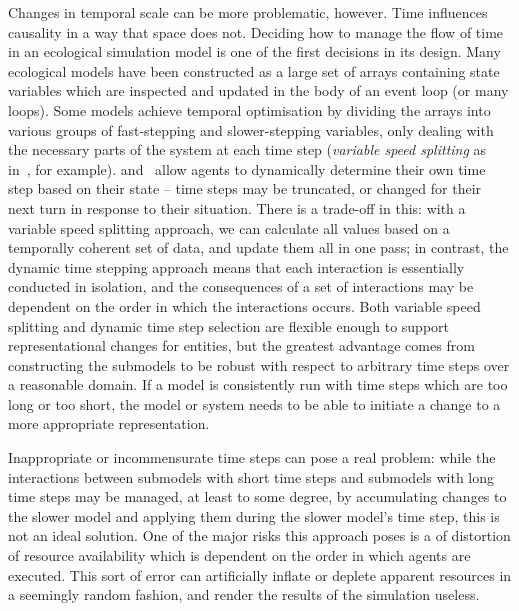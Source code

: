 Changes in temporal scale can be more problematic, however. Time
influences causality in a way that space does not. Deciding how to
manage the flow of time in an ecological simulation model is one of
the first decisions in its design.  Many ecological models have been
constructed as a large set of arrays containing state variables which
are inspected and updated in the body of an event loop (or many
loops). Some models achieve temporal optimisation by dividing the
arrays into various groups of fast-stepping and slower-stepping
variables, only dealing with the necessary parts of the system at each
time step (\emph{variable speed splitting\/} as
in~\cite{walters2000ecosystem}, for example). \Cite{gray2006nws}
and~\cite{gray2014} allow agents to dynamically determine their own
time step based on their state --  time steps may be truncated, or
changed for their next turn in response to their situation. There is a
trade-off in this: with a variable speed splitting approach, we can
calculate all values based on a temporally coherent set of data, and
update them all in one pass; in contrast, the dynamic time stepping
approach means that each interaction is essentially conducted in
isolation, and the consequences of a set of interactions may be
dependent on the order in which the interactions occurs. Both variable
speed splitting and dynamic time step selection are flexible enough to
support representational changes for entities, but the greatest
advantage comes from constructing the submodels to be robust with
respect to arbitrary time steps over a reasonable domain.  If a model
is consistently run with time steps which are too long or too short,
the model or system needs to be able to initiate a change to a more
appropriate representation.

Inappropriate or incommensurate time steps can pose a real problem:
while the interactions between submodels with short time steps and
submodels with long time steps may be managed, at least to some degree,
by accumulating changes to the slower model and applying them during
the slower model's time step,  this is not an ideal solution. One of
the major risks this approach poses is a of distortion of resource
availability which is dependent on the order in which agents are
executed. This sort of error can artificially inflate or deplete
apparent resources in a seemingly random fashion, and render the
results of the simulation useless.



